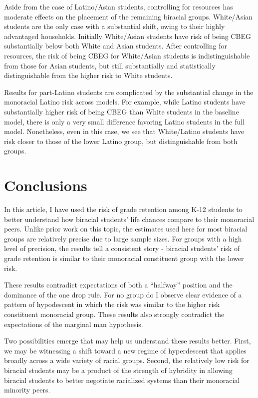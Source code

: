\documentclass[
  12pt,
  letterpaper,
]{article}
\begin{document}
Aside from the case of Latino/Asian students, controlling for resources
has moderate effects on the placement of the remaining biracial groups.
White/Asian students are the only case with a substantial shift, owing
to their highly advantaged households. Initially White/Asian students
have risk of being CBEG substantially below both White and Asian
students. After controlling for resources, the risk of being CBEG for
White/Asian students is indistinguishable from those for Asian students,
but still substantially and statistically distinguishable from the
higher risk to White students.

Results for part-Latino students are complicated by the substantial
change in the monoracial Latino risk across models. For example, while
Latino students have substantially higher risk of being CBEG than White
students in the baseline model, there is only a very small difference
favoring Latino students in the full model. Nonetheless, even in this
case, we see that White/Latino students have risk closer to those of the
lower Latino group, but distinguishable from both groups.

\hypertarget{conclusions}{%
\section{Conclusions}\label{conclusions}}

In this article, I have used the risk of grade retention among K-12
students to better understand how biracial students' life chances
compare to their monoracial peers. Unlike prior work on this topic, the
estimates used here for most biracial groups are relatively precise due
to large sample sizes. For groups with a high level of precision, the
results tell a consistent story - biracial students' risk of grade
retention is similar to their monoracial constituent group with the
lower risk.

These results contradict expectations of both a ``halfway'' position and
the dominance of the one drop rule. For no group do I observe clear
evidence of a pattern of hypodescent in which the risk was similar to
the higher risk constituent monoracial group. These results also
strongly contradict the expectations of the marginal man hypothesis.

Two possibilities emerge that may help us understand these results
better. First, we may be witnessing a shift toward a new regime of
hyperdescent that applies broadly across a wide variety of racial
groups. Second, the relatively low risk for biracial students may be a
product of the strength of hybridity in allowing biracial students to
better negotiate racialized systems than their monoracial minority
peers.
\end{document}
